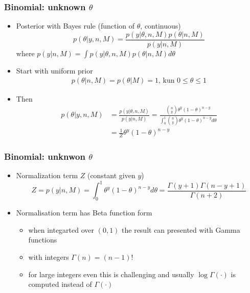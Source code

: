 \documentclass[english,t]{beamer}
\renewcommand{\emph}[1]{\textcolor{navyblue}{#1}}
\begin{document}
\begin{frame}
  \frametitle{Binomial: unknown $\theta$}

  \begin{itemize}
  \item Posterior with Bayes rule (function of $\theta$, continuous)
    \begin{equation*}
      p(\theta|y,n,M)=\frac{p(y|\theta,n,M)p(\theta|n,M)}{p(y|n,M)}
    \end{equation*}
    \pause
    where $p(y|n,M)=\int p(y|\theta,n,M)p(\theta|n,M) d\theta$
  \item<3-> Start with uniform prior
    \begin{align*}
      p(\theta|n,M)=p(\theta|M)=1,\, \text{kun}\,\, 0\leq\theta\leq 1
    \end{align*}
  \item<4-> Then
    \begin{align*}
      p(\theta|y,n,M)&=\frac{p(y|\theta,n,M)}{p(y|n,M)} 
      =\frac{\binom{n}{y} \theta^y(1-\theta)^{n-y}}{\int_0^1
        \binom{n}{y} \theta^y(1-\theta)^{n-y} d\theta} \\
        &=\frac{1}{Z}\theta^y(1-\theta)^{n-y}
    \end{align*}
  \end{itemize}

\end{frame}

\begin{frame}
  \frametitle{Binomial: unknwon $\theta$}

  \begin{itemize}
  \item Normalization term $Z$ (constant given $y$)
    \begin{equation*}
      Z=p(y|n,M)= \int_0^1 \theta^y(1-\theta)^{n-y} d\theta = \frac{\Gamma(y+1)\Gamma(n-y+1)}{\Gamma(n+2)}
    \end{equation*}
  \item Normalisation term has \emph{Beta} function form 
    \begin{itemize}
    \item when integarted over $(0,1)$
      the result can presented with Gamma functions
    \item with integers  $\Gamma(n)=(n-1)!$
    \item for large integers even this is challenging and usually
      $\log \Gamma(\cdot)$ is computed instead of $\Gamma(\cdot)$
    \end{itemize}
  \end{itemize}

\end{frame}
\end{document}
